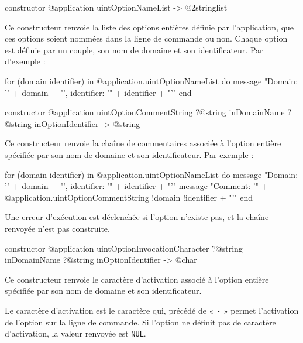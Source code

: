 
\begin{galgas3box}
constructor @application uintOptionNameList -> @2stringlist
\end{galgas3box}

Ce constructeur renvoie la liste des options entières définie par l'application, que ces options soient nommées dans la ligne de commande ou non. Chaque option est définie par un couple, son nom de domaine et son identificateur. Par d'exemple :
\begin{galgas3}
for (domain identifier) in @application.uintOptionNameList do
  message "Domain: '" + domain + "', identifier: '" + identifier + "'\n"
end
\end{galgas3}



\begin{galgas3box}
constructor @application uintOptionCommentString
    ?@string inDomainName
    ?@string inOptionIdentifier -> @string
\end{galgas3box}

Ce constructeur renvoie la chaîne de commentaires associée à l'option entière spécifiée par son nom de domaine et son identificateur. Par exemple :
\begin{galgas3}
for (domain identifier) in @application.uintOptionNameList do
  message "Domain: '" + domain + "', identifier: '" + identifier + "'\n"
  message "Comment: '"
    + @application.uintOptionCommentString {!domain !identifier} + "'\n"
end
\end{galgas3}

Une erreur d'exécution est déclenchée si l'option n'existe pas, et la chaîne renvoyée n'est pas construite.



\begin{galgas3box}
constructor @application uintOptionInvocationCharacter
    ?@string inDomainName
    ?@string inOptionIdentifier -> @char
\end{galgas3box}

Ce constructeur renvoie le caractère d'activation associé à l'option entière spécifiée par son nom de domaine et son identificateur.

Le caractère d'activation est le caractère qui, précédé de « \texttt{-} » permet l'activation de l'option sur la ligne de commande. Si l'option ne définit pas de caractère d'activation, la valeur renvoyée est \texttt{NUL}.

